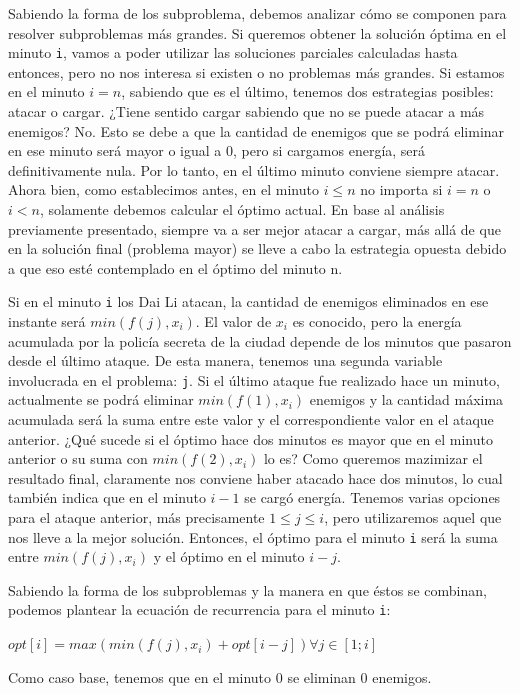 \documentclass{article}
\begin{document}
Sabiendo la forma de los subproblema, debemos analizar cómo se componen para resolver subproblemas más grandes. Si queremos obtener la solución óptima en el minuto \texttt{i}, vamos a poder utilizar las soluciones parciales calculadas hasta entonces, pero no nos interesa si existen o no problemas más grandes. Si estamos en el minuto $i = n$, sabiendo que es el último, tenemos dos estrategias posibles: atacar o cargar. ¿Tiene sentido cargar sabiendo que no se puede atacar a más enemigos? No. Esto se debe a que la cantidad de enemigos que se podrá eliminar en ese minuto será  mayor o igual a 0, pero si cargamos energía, será definitivamente nula. Por lo tanto, en el último minuto conviene siempre atacar. Ahora bien, como establecimos antes, en el minuto $i \leq n$ no importa si $i = n$ o $i < n$, solamente debemos calcular el óptimo actual. En base al análisis previamente presentado, siempre va a ser mejor atacar a cargar, más allá de que en la solución final (problema mayor) se lleve a cabo la estrategia opuesta debido a que eso esté contemplado en el óptimo del minuto n. 

Si en el minuto \texttt{i} los Dai Li atacan, la cantidad de enemigos eliminados en ese instante será $min(f(j), x_i)$. El valor de $x_i$ es conocido, pero la energía acumulada por la policía secreta de la ciudad depende de los minutos que pasaron desde el último ataque. De esta manera, tenemos una segunda variable involucrada en el problema: \texttt{j}. Si el último ataque fue realizado hace un minuto, actualmente se podrá eliminar $min(f(1), x_i)$ enemigos y la cantidad máxima acumulada será la suma entre este valor y el correspondiente valor en el ataque anterior. ¿Qué sucede si el óptimo hace dos minutos es mayor que en el minuto anterior o su suma con $min(f(2), x_i)$ lo es? Como queremos mazimizar el resultado final, claramente nos conviene haber atacado hace dos minutos, lo cual también indica que en el minuto $i - 1$ se cargó energía. Tenemos varias opciones para el ataque anterior, más precisamente $1 \leq j \leq i$, pero utilizaremos aquel que nos lleve a la mejor solución. Entonces, el óptimo para el minuto \texttt{i} será la suma entre $min(f(j), x_i)$ y el óptimo en el minuto $i - j$.

Sabiendo la forma de los subproblemas y la manera en que éstos se combinan, podemos plantear la ecuación de recurrencia para el minuto \texttt{i}:

$
opt[i] = max(min(f(j), x_i) + opt[i - j]) \forall j \in [1; i]
$

Como caso base, tenemos que en el minuto 0 se eliminan 0 enemigos.
\end{document}
